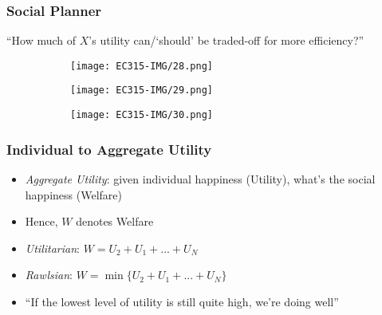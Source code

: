 \documentclass[11pt, english]{article}
\begin{document}
		\subsubsection{Social Planner}

	``How much of $X$'s utility can/`should' be traded-off for more efficiency?''

	\begin{figure}[H]
	\begin{center}
		\begin{subfigure}[t]{4cm}  
                \begin{center}
                        \texttt{[image: EC315-IMG/28.png]}        
                \end{center}
                \end{subfigure}      
                \begin{subfigure}[t]{4cm}  
                \begin{center}
                        \texttt{[image: EC315-IMG/29.png]}        
                \end{center}
                \end{subfigure}
                \begin{subfigure}[t]{4cm}  
                \begin{center}
                        \texttt{[image: EC315-IMG/30.png]}      
                \end{center}
                \end{subfigure}
	\end{center}
	\end{figure}

		\subsubsection{Individual to Aggregate Utility}

	\begin{itemize}
	\setlength\itemsep{0cm}
		\item \textit{Aggregate Utility}: given individual happiness (Utility), what's the social happiness (Welfare)
		\item Hence, $W$ denotes Welfare
		\item \textit{Utilitarian}: $W=U_2+U_1+...+U_N$
		\item \textit{Rawlsian}: $W=\min\{U_2+U_1+...+U_N\}$
		\item ``If the lowest level of utility is still quite high, we're doing well''
	\end{itemize}
\end{document}
